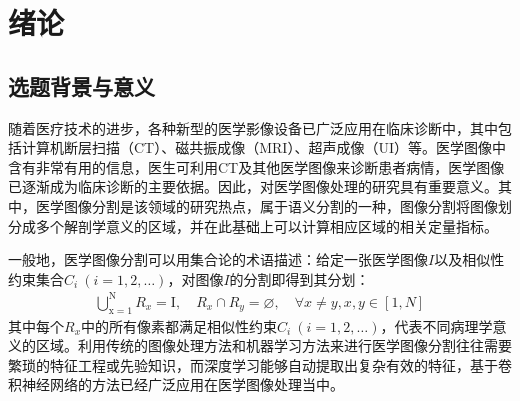 
\chapter{绪论}
\label{cha:introduction}
\section{选题背景与意义}
\label{sec:background}
随着医疗技术的进步，各种新型的医学影像设备已广泛应用在临床诊断中，其中包括计算机断层扫描（CT）、磁共振成像（MRI）、超声成像（UI）等。医学图像中含有非常有用的信息，医生可利用CT及其他医学图像来诊断患者病情，医学图像已逐渐成为临床诊断的主要依据。因此，对医学图像处理的研究具有重要意义。其中，医学图像分割是该领域的研究热点，属于语义分割的一种，图像分割将图像划分成多个解剖学意义的区域，并在此基础上可以计算相应区域的相关定量指标。

一般地，医学图像分割可以用集合论的术语描述\cite{liu2021review}：给定一张医学图像$I$以及相似性约束集合$C_i\ (i=1,2,\dots)$，对图像$I$的分割即得到其分划：
\begin{align}
    \bigcup_{\mathrm{x}=1}^{\mathrm{N}} R_{x}=\mathrm{I}, \quad R_{x} \cap R_{y}=\varnothing, \quad \forall x \neq y, x, y \in[1, N]
\end{align}
其中每个$R_x$中的所有像素都满足相似性约束$C_i\ (i=1,2,\dots)$，代表不同病理学意义的区域。利用传统的图像处理方法和机器学习方法来进行医学图像分割往往需要繁琐的特征工程或先验知识，而深度学习能够自动提取出复杂有效的特征，基于卷积神经网络的方法已经广泛应用在医学图像处理当中。

